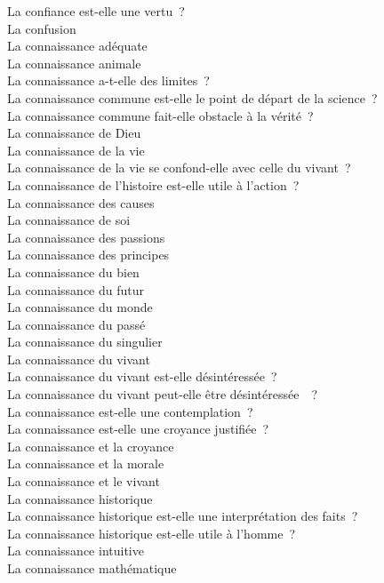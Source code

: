 \documentclass[a4paper,12pt]{article}
\begin{document}
La confiance est-elle une vertu ? \\
La confusion \\
La connaissance adéquate \\
La connaissance animale \\
La connaissance a-t-elle des limites ? \\
La connaissance commune est-elle le point de départ de la science ? \\
La connaissance commune fait-elle obstacle à la vérité ? \\
La connaissance de Dieu \\
La connaissance de la vie \\
La connaissance de la vie se confond-elle avec celle du vivant ? \\
La connaissance de l'histoire est-elle utile à l'action ? \\
La connaissance des causes \\
La connaissance de soi \\
La connaissance des passions \\
La connaissance des principes \\
La connaissance du bien \\
La connaissance du futur \\
La connaissance du monde \\
La connaissance du passé \\
La connaissance du singulier \\
La connaissance du vivant \\
La connaissance du vivant est-elle désintéressée ? \\
La connaissance du vivant peut-elle être désintéressée  ? \\
La connaissance est-elle une contemplation ? \\
La connaissance est-elle une croyance justifiée ? \\
La connaissance et la croyance \\
La connaissance et la morale \\
La connaissance et le vivant \\
La connaissance historique \\
La connaissance historique est-elle une interprétation des faits ? \\
La connaissance historique est-elle utile à l'homme ? \\
La connaissance intuitive \\
La connaissance mathématique \\
\end{document}
